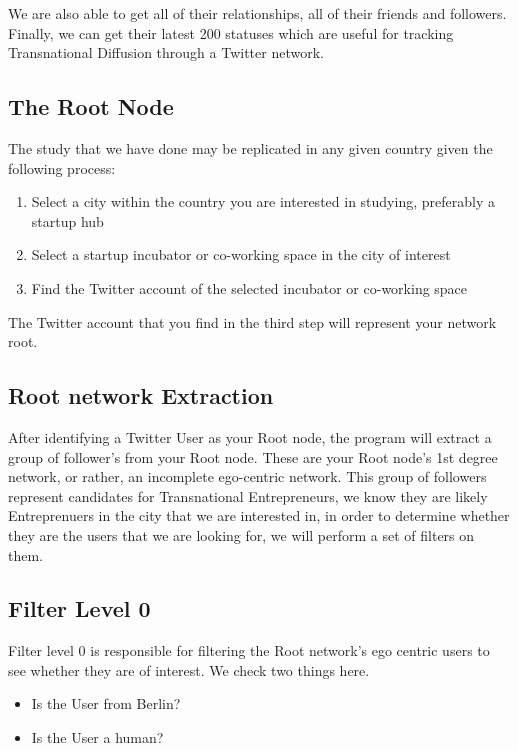 We are also able to get all of their relationships, all of their friends and followers. Finally, we can get their latest 200 statuses which are useful for tracking Transnational Diffusion through a Twitter network.

\subsection{The Root Node}
The study that we have done may be replicated in any given country given the following process:

\begin{enumerate}
\item Select a city within the country you are interested in studying, preferably a startup hub
\item Select a startup incubator or co-working space in the city of interest
\item Find the Twitter account of the selected incubator or co-working space
\end{enumerate}

The Twitter account that you find in the third step will represent your network root.

\subsection{Root network Extraction}
After identifying a Twitter User as your Root node, the program will extract a group of follower's from your Root node. These are your Root node's 1st degree network, or rather, an incomplete ego-centric network. This group of followers represent candidates for Transnational Entrepreneurs, we know they are likely Entreprenuers in the city that we are interested in, in order to determine whether they are the users that we are looking for, we will perform a set of filters on them.

\subsection{Filter Level 0}
Filter level 0 is responsible for filtering the Root network's ego centric users to see whether they are of interest. We check two things here.

\begin{itemize}
\item Is the User from Berlin?
\item Is the User a human?
\end{itemize}


